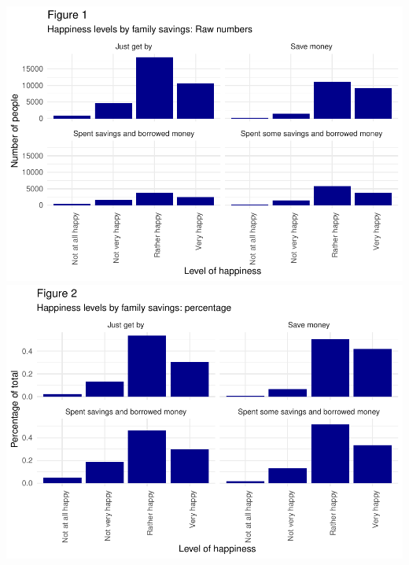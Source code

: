 \documentclass[man]{apa6}
\begin{document}
\includegraphics{610_final_files/figure-latex/happiness and family savings JW-1.pdf}
\includegraphics{610_final_files/figure-latex/happiness and family savings JW-2.pdf}
\end{document}
